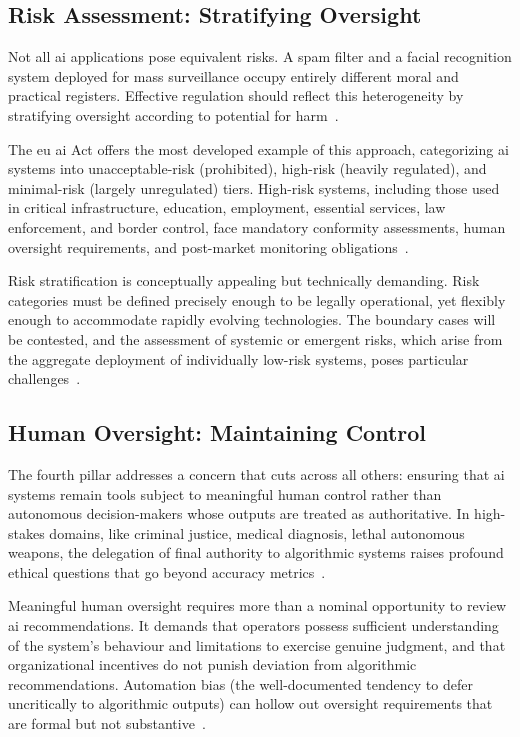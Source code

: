 \documentclass[11pt,showkeys]{essay}
\begin{document}
\subsection{Risk Assessment: Stratifying Oversight}

Not all \gls{ai} applications pose equivalent risks. A spam filter and a facial recognition system deployed for mass surveillance occupy entirely different moral and practical registers. Effective regulation should reflect this heterogeneity by stratifying oversight according to potential for harm~\cite{eu_proposal_2021}.

The \gls{eu} \gls{ai} Act offers the most developed example of this approach, categorizing \gls{ai} systems into unacceptable-risk (prohibited), high-risk (heavily regulated), and minimal-risk (largely unregulated) tiers. High-risk systems, including those used in critical infrastructure, education, employment, essential services, law enforcement, and border control, face mandatory conformity assessments, human oversight requirements, and post-market monitoring obligations~\cite{eu_proposal_2021}.

Risk stratification is conceptually appealing but technically demanding. Risk categories must be defined precisely enough to be legally operational, yet flexibly enough to accommodate rapidly evolving technologies. The boundary cases will be contested, and the assessment of systemic or emergent risks, which arise from the aggregate deployment of individually low-risk systems, poses particular challenges~\cite{dafoe_ai_2018}.

\subsection{Human Oversight: Maintaining Control}

The fourth pillar addresses a concern that cuts across all others: ensuring that \gls{ai} systems remain tools subject to meaningful human control rather than autonomous decision-makers whose outputs are treated as authoritative. In high-stakes domains, like criminal justice, medical diagnosis, lethal autonomous weapons, the delegation of final authority to algorithmic systems raises profound ethical questions that go beyond accuracy metrics~\cite{floridi_ai4peopleethical_2018}.

Meaningful human oversight requires more than a nominal opportunity to review \gls{ai} recommendations. It demands that operators possess sufficient understanding of the system's behaviour and limitations to exercise genuine judgment, and that organizational incentives do not punish deviation from algorithmic recommendations. Automation bias (the well-documented tendency to defer uncritically to algorithmic outputs) can hollow out oversight requirements that are formal but not substantive~\cite{veale_fairness_2018}.
\end{document}
